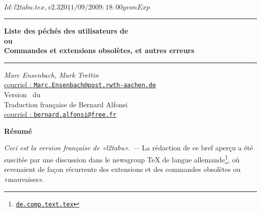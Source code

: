 \documentclass[fontsize=11pt, paper=a4, pagesize, captions=tableheading, numbers=enddot, toc=graduated, footnotes=multiple]{scrartcl}%
\newcommand{\EMail}[1]{\href{mailto:#1?Subject=[l2tabu.pdf]}{courriel : \texttt{#1}}}
\newcommand{\News}[1]{\href{news:#1}{\texttt{#1}}}
\newcommand{\EMail}[1]{\href{mailto:#1}{\texttt{#1}}}
\newcommand{\News}[1]{\href{news:#1}{\texttt{#1}}}
\begin{document}
\pagestyle{headings}
\rcsInfo $Id: l2tabu.tex,v 2.3 2011/09/20 09:18:00 yvon Exp $

\begin{titlepage}
\begin{flushleft}
    \noindent
  \rule{\linewidth}{1pt}%
  \vspace{2\baselineskip}
  {\LARGE\bfseries
  Liste des péchés des utilisateurs de \LaTeXe\\[1ex]
    \large
   \quad ou\\[0.5\baselineskip]
         Commandes et extensions obsolètes, et autres erreurs}\\
  \vspace{2\baselineskip}
  \noindent
  \rule{\linewidth}{1pt}%
\end{flushleft}
  \vspace{\baselineskip}
\begin{flushright}
  \textit{Marc Ensenbach, Mark Trettin}\\
  \EMail{Marc.Ensenbach@post.rwth-aachen.de}\\[1.5\baselineskip]
  Version \rcsInfoRevision\ du \rcsInfoLongDate\\[1.5\baselineskip]
  {\footnotesize Traduction française de Bernard Alfonsi\\
  \EMail{bernard.alfonsi@free.fr}}\\[4\baselineskip]
\end{flushright}
  \vspace{\baselineskip}
  \begin{center}
    \let\footnoterule\relax
    \begin{minipage}{.9\linewidth}
      \small
      \begin{center}
        \textbf{Résumé}
      \end{center}
      \noindent

 \emph{Ceci est la version française de «l2tabu». — }
La rédaction de ce bref aperçu a été suscitée par une discussion dans le newsgroup \TeX{} de langue allemande\footnote{\News{de.comp.text.tex}}, où revenaient de façon récurrente des extensions et des commandes obsolètes ou «mauvaises».


\end{minipage}
\end{center}
\end{titlepage}
\end{document}
